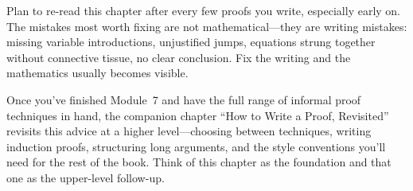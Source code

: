 \documentclass[11pt]{article}
\begin{document}
Plan to re-read this chapter after every few proofs you write, especially early on. The mistakes most worth fixing are not mathematical---they are writing mistakes: missing variable introductions, unjustified jumps, equations strung together without connective tissue, no clear conclusion. Fix the writing and the mathematics usually becomes visible.

Once you've finished Module~7 and have the full range of informal proof techniques in hand, the companion chapter ``How to Write a Proof, Revisited'' revisits this advice at a higher level---choosing between techniques, writing induction proofs, structuring long arguments, and the style conventions you'll need for the rest of the book. Think of this chapter as the foundation and that one as the upper-level follow-up.
\end{document}
